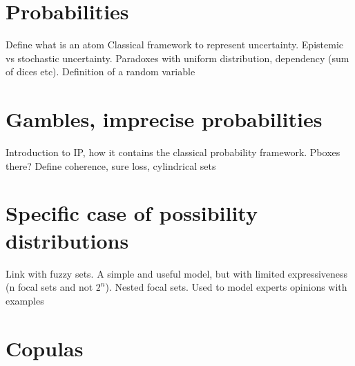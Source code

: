 \section{Probabilities}
Define what is an atom
Classical framework to represent uncertainty. Epistemic vs stochastic uncertainty. Paradoxes with uniform distribution, dependency (sum of dices etc). Definition of a random variable \etc
\section{Gambles, imprecise probabilities}
Introduction to IP, how it contains the classical probability framework. Pboxes there?
Define coherence, sure loss, cylindrical sets
\section{Specific case of possibility distributions}
Link with fuzzy sets. A simple and useful model, but with limited expressiveness (n focal sets and not $2^n$). Nested focal sets. Used to model experts opinions with examples \cite{baudrit_joint_2007}

\section{Copulas}\label{sec:copulas}

